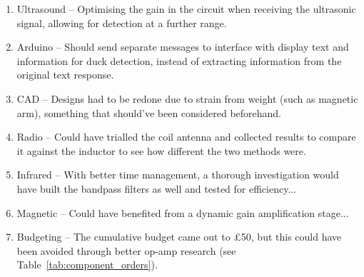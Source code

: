 \begin{enumerate}
    \item Ultrasound -- Optimising the gain in the circuit when receiving the ultrasonic signal, allowing for detection at a further range.
    \item Arduino -- Should send separate messages to interface with display text and information for duck detection, instead of extracting information from the original text response.
    \item CAD -- Designs had to be redone due to strain from weight (such as magnetic arm), something that should've been considered beforehand.
    \item Radio -- Could have trialled the coil antenna and collected results to compare it against the inductor to see how different the two methods were.
    \item Infrared -- With better time management, a thorough investigation would have built the bandpass filters as well and tested for efficiency...
    \item Magnetic -- Could have benefited from a dynamic gain amplification stage...
    \item Budgeting -- The cumulative budget came out to £50, but this could have been avoided through better op-amp research (see Table~\ref{tab:component_orders}).
\end{enumerate}

